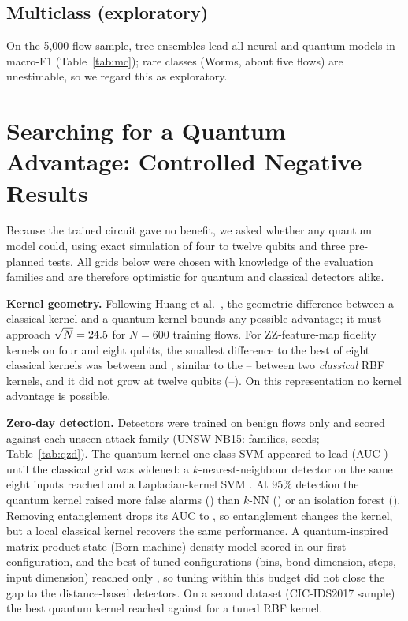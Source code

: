 \IfFileExists{IEEEtran.cls}{\documentclass[conference]{IEEEtran}}{\documentclass[10pt,twocolumn]{article}\usepackage[margin=0.8in]{geometry}}
\newcommand{\fit}[1]{\resizebox{\ifdim\width>\columnwidth\columnwidth\else\width\fi}{!}{#1}}
\begin{document}
\begin{table}[t]\centering\caption{Zero-day detection (benign-only training).}\label{tab:zd}\small
\fit{}\end{table}

\subsection{Multiclass (exploratory)}
On the 5{,}000-flow sample, tree ensembles lead all neural and quantum models in macro-F1 (Table~\ref{tab:mc}); rare classes (Worms, about five flows) are unestimable, so we regard this as exploratory.

\begin{table}[t]\centering\caption{Multiclass, 5{,}000-flow sample, five seeds.}\label{tab:mc}\small
\fit{}\end{table}

\section{Searching for a Quantum Advantage: Controlled Negative Results}
Because the trained circuit gave no benefit, we asked whether any quantum model could, using exact simulation of four to twelve qubits and three pre-planned tests. All grids below were chosen with knowledge of the evaluation families and are therefore optimistic for quantum and classical detectors alike.

\textbf{Kernel geometry.} Following Huang et al.~\cite{huang2021power}, the geometric difference between a classical kernel and a quantum kernel bounds any possible advantage; it must approach $\sqrt{N}=24.5$ for $N=600$ training flows. For ZZ-feature-map fidelity kernels on four and eight qubits, the smallest difference to the best of eight classical kernels was between \gdLo{} and \gdHi{}, similar to the \gdRefLo--\gdRefHi{} between two \emph{classical} RBF kernels, and it did not grow at twelve qubits (\gdTwelveLo--\gdTwelveHi). On this representation no kernel advantage is possible.

\textbf{Zero-day detection.} Detectors were trained on benign flows only and scored against each unseen attack family (UNSW-NB15: \zdFamilies{} families, \zdSeeds{} seeds; Table~\ref{tab:qzd}). The quantum-kernel one-class SVM appeared to lead (AUC \zdQkAuc{}) until the classical grid was widened: a $k$-nearest-neighbour detector on the same eight inputs reached \zdKnnAuc{} and a Laplacian-kernel SVM \zdLapAuc{}. At 95\% detection the quantum kernel raised more false alarms (\zdQkFpr{}) than $k$-NN (\zdKnnFpr{}) or an isolation forest (\zdIfFpr{}). Removing entanglement drops its AUC to \zdNoEntAuc{}, so entanglement changes the kernel, but a local classical kernel recovers the same performance. A quantum-inspired matrix-product-state (Born machine) density model scored \zdMpsAuc{} in our first configuration, and the best of \mpsTunedConfigs{} tuned configurations (bins, bond dimension, steps, input dimension) reached only \mpsTunedBest{}, so tuning within this budget did not close the gap to the distance-based detectors. On a second dataset (CIC-IDS2017 sample) the best quantum kernel reached \zdCicQkAuc{} against \zdCicRbfAuc{} for a tuned RBF kernel.
\end{document}
